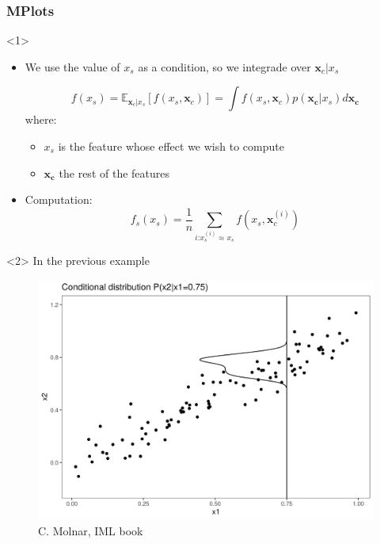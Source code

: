 \documentclass{beamer}
\newcommand{\Vx}{\mathbf{x}}
\begin{document}
\begin{frame}
  \frametitle{MPlots}

  \begin{onlyenv}<1>
    \begin{itemize}
    \item We use the value of $x_s$ as a condition, so we integrade over \(\Vx_c|x_s\)

      \[f(x_s) = \mathbb{E}_{\Vx_c|x_s}[f(x_s, \Vx_c)] = \int f(x_s, \Vx_c) p(\bm{x_c}|x_s) d\bm{x_c} \]
      where:

      \begin{itemize}
      \item $x_s$ is the feature whose effect we wish to compute
      \item $\bm{x_c}$ the rest of the features
      \end{itemize}

    \item Computation:
      \begin{equation*}
        f_s(x_s) = \frac{1}{n}\sum\limits_{i \text{:} x_s^{(i)} \approx x_s} f(x_s, \Vx_c^{(i)})
      \end{equation*}

    \end{itemize}
  \end{onlyenv}
  \begin{onlyenv}<2>
    In the previous example
    \begin{figure}
      \includegraphics[width=.6\textwidth]{./figures/aleplot-motivation2-1}
      \caption{\footnotesize C. Molnar, IML book}
    \end{figure}
  \end{onlyenv}
\end{frame}
\end{document}

